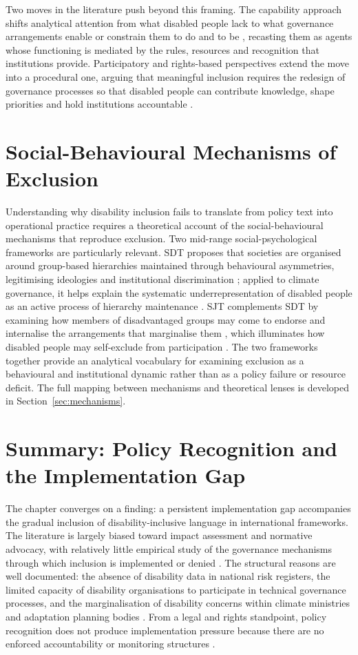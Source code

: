 \documentclass[12pt,a4paper]{report}
\begin{document}
Two moves in the literature push beyond this framing. The capability approach shifts analytical attention from what disabled people lack to what governance arrangements enable or constrain them to do and to be \cite{Ton2019}, recasting them as agents whose functioning is mediated by the rules, resources and recognition that institutions provide. Participatory and rights-based perspectives extend the move into a procedural one, arguing that meaningful inclusion requires the redesign of governance processes so that disabled people can contribute knowledge, shape priorities and hold institutions accountable \cite{Polack2008}.

\section{Social-Behavioural Mechanisms of Exclusion}
Understanding why disability inclusion fails to translate from policy text into operational practice requires a theoretical account of the social-behavioural mechanisms that reproduce exclusion. Two mid-range social-psychological frameworks are particularly relevant. SDT proposes that societies are organised around group-based hierarchies maintained through behavioural asymmetries, legitimising ideologies and institutional discrimination \cite{sidanius_pratto_1999_socdom}; applied to climate governance, it helps explain the systematic underrepresentation of disabled people as an active process of hierarchy maintenance \cite{King2022}. SJT complements SDT by examining how members of disadvantaged groups may come to endorse and internalise the arrangements that marginalise them \cite{jost_2003_decade}, which illuminates how disabled people may self-exclude from participation \cite{Akike2025}. The two frameworks together provide an analytical vocabulary for examining exclusion as a behavioural and institutional dynamic rather than as a policy failure or resource deficit. The full mapping between mechanisms and theoretical lenses is developed in Section~\ref{sec:mechanisms}.

\section{Summary: Policy Recognition and the Implementation Gap}
The chapter converges on a finding: a persistent implementation gap accompanies the gradual inclusion of disability-inclusive language in international frameworks. The literature is largely biased toward impact assessment and normative advocacy, with relatively little empirical study of the governance mechanisms through which inclusion is implemented or denied \cite{Makuyana2023,Stein2023}. The structural reasons are well documented: the absence of disability data in national risk registers, the limited capacity of disability organisations to participate in technical governance processes, and the marginalisation of disability concerns within climate ministries and adaptation planning bodies \cite{Grossi2023}. From a legal and rights standpoint, policy recognition does not produce implementation pressure because there are no enforced accountability or monitoring structures \cite{Brunne2025}.
\end{document}

